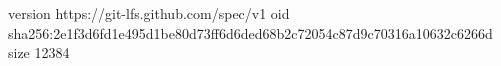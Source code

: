version https://git-lfs.github.com/spec/v1
oid sha256:2e1f3d6fd1e495d1be80d73ff6d6ded68b2c72054c87d9c70316a10632c6266d
size 12384
